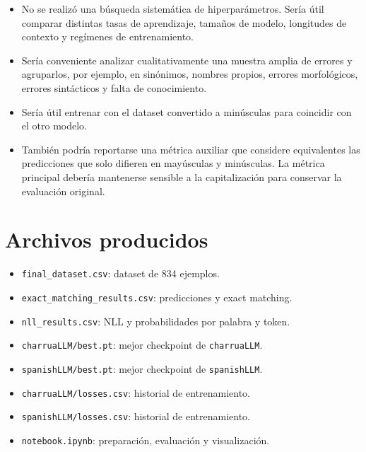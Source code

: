 \documentclass[11pt,a4paper]{article}
\newcommand{\charrua}{\texttt{charruaLLM}}
\newcommand{\spanishmodel}{\texttt{spanishLLM}}
\newcommand{\code}[1]{\texttt{#1}}
\begin{document}
\begin{itemize}
    \item No se realizó una búsqueda sistemática de hiperparámetros. Sería útil
          comparar distintas tasas de aprendizaje, tamaños de modelo, longitudes
          de contexto y regímenes de entrenamiento.
    \item Sería conveniente analizar cualitativamente una muestra amplia de
          errores y agruparlos, por ejemplo, en sinónimos, nombres propios,
          errores morfológicos, errores sintácticos y falta de conocimiento.
    \item Sería útil entrenar con el dataset convertido a minúsculas para
          coincidir con el otro modelo.
    \item También podría reportarse una métrica auxiliar que considere
          equivalentes las predicciones que solo difieren en mayúsculas y
          minúsculas. La métrica principal debería mantenerse sensible a la
          capitalización para conservar la evaluación original.
\end{itemize}


\section{Archivos producidos}

\begin{itemize}
    \item \code{final\_dataset.csv}: dataset de 834 ejemplos.
    \item \code{exact\_matching\_results.csv}: predicciones y exact matching.
    \item \code{nll\_results.csv}: NLL y probabilidades por palabra y token.
    \item \code{charruaLLM/best.pt}: mejor checkpoint de \charrua.
    \item \code{spanishLLM/best.pt}: mejor checkpoint de \spanishmodel.
    \item \code{charruaLLM/losses.csv}: historial de entrenamiento.
    \item \code{spanishLLM/losses.csv}: historial de entrenamiento.
    \item \code{notebook.ipynb}: preparación, evaluación y visualización.
\end{itemize}
\end{document}
